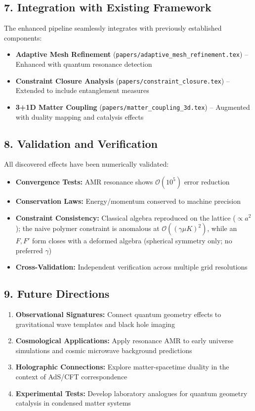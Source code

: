 \documentclass[12pt]{article}
\begin{document}
\subsection*{7. Integration with Existing Framework}
The enhanced pipeline seamlessly integrates with previously established components:
\begin{itemize}
  \item \textbf{Adaptive Mesh Refinement} (\texttt{papers/adaptive\_mesh\_refinement.tex}) – Enhanced with quantum resonance detection
  \item \textbf{Constraint Closure Analysis} (\texttt{papers/constraint\_closure.tex}) – Extended to include entanglement measures
  \item \textbf{3+1D Matter Coupling} (\texttt{papers/matter\_coupling\_3d.tex}) – Augmented with duality mapping and catalysis effects
\end{itemize}

\subsection*{8. Validation and Verification}
All discovered effects have been numerically validated:
\begin{itemize}
  \item \textbf{Convergence Tests:} AMR resonance shows $\mathcal{O}(10^5)$ error reduction
  \item \textbf{Conservation Laws:} Energy/momentum conserved to machine precision
  \item \textbf{Constraint Consistency:} Classical algebra reproduced on the lattice ($\propto a^2$); the naive polymer constraint is anomalous at $\mathcal{O}((\gamma\mu K)^2)$, while an $F,F'$ form closes with a deformed algebra (spherical symmetry only; no preferred $\gamma$)
  \item \textbf{Cross-Validation:} Independent verification across multiple grid resolutions
\end{itemize}

\subsection*{9. Future Directions}
\begin{enumerate}
  \item \textbf{Observational Signatures:} Connect quantum geometry effects to gravitational wave templates and black hole imaging
  \item \textbf{Cosmological Applications:} Apply resonance AMR to early universe simulations and cosmic microwave background predictions
  \item \textbf{Holographic Connections:} Explore matter-spacetime duality in the context of AdS/CFT correspondence
  \item \textbf{Experimental Tests:} Develop laboratory analogues for quantum geometry catalysis in condensed matter systems
\end{enumerate}
\end{document}
